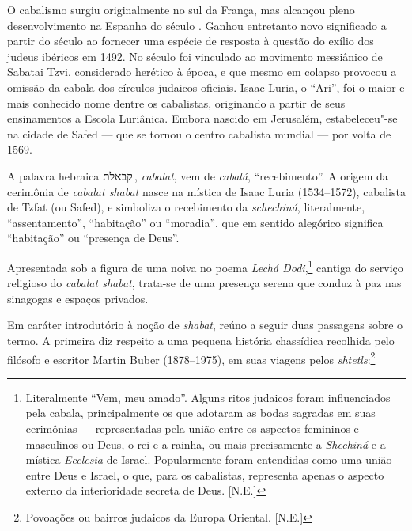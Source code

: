 O cabalismo surgiu originalmente no sul da França, mas alcançou pleno
desenvolvimento na Espanha do século .  Ganhou entretanto
novo significado a partir do século  ao fornecer uma
espécie de resposta à questão do exílio dos judeus ibéricos em 1492. No
século  foi vinculado ao movimento messiânico de Sabatai
Tzvi, considerado herético à época, e que mesmo em colapso provocou a
omissão da cabala dos círculos judaicos oficiais.  Isaac Luria, o
``Ari'', foi o maior e mais conhecido nome dentre os cabalistas,
originando a partir de seus ensinamentos a Escola Luriânica. Embora
nascido em Jerusalém, estabeleceu"-se na cidade de Safed --- que se
tornou o centro cabalista mundial --- por volta de 1569. 

A palavra hebraica קבאלת\,, 
\emph{cabalat}, vem de \emph{cabalá}, ``recebimento''. A
origem da cerimônia de \emph{cabalat shabat} nasce na mística de Isaac Luria (1534--1572),
cabalista de Tzfat (ou Safed), e simboliza o recebimento
da \emph{schechiná}, literalmente, ``assentamento'', ``habitação'' ou ``moradia'', que 
em sentido alegórico significa ``habitação'' ou ``presença de Deus''. 

Apresentada sob a figura de uma noiva no poema \emph{Lechá Dodi},\footnote{Literalmente ``Vem, meu amado''. Alguns ritos judaicos foram influenciados pela cabala, principalmente os que adotaram as bodas sagradas em suas cerimônias --- representadas pela união entre os aspectos femininos e masculinos ou Deus, o rei e a rainha, ou mais precisamente a \emph{Shechiná} e a mística \emph{Ecclesia} de Israel. Popularmente foram entendidas como uma união entre Deus e Israel, o que, para os cabalistas, representa apenas o aspecto externo da interioridade secreta de Deus. [N.E.]} cantiga do 
serviço religioso do \textit{cabalat shabat}, trata-se de uma
presença serena que conduz à paz nas sinagogas e espaços privados.

Em caráter introdutório à noção de \emph{shabat}, reúno a seguir duas
passagens sobre o termo. A primeira diz respeito a uma pequena história chassídica 
recolhida pelo filósofo e escritor  
Martin Buber (1878--1975), em suas viagens pelos \emph{shtetls}:\footnote{Povoações ou bairros 
judaicos da Europa Oriental. [N.E.]}

